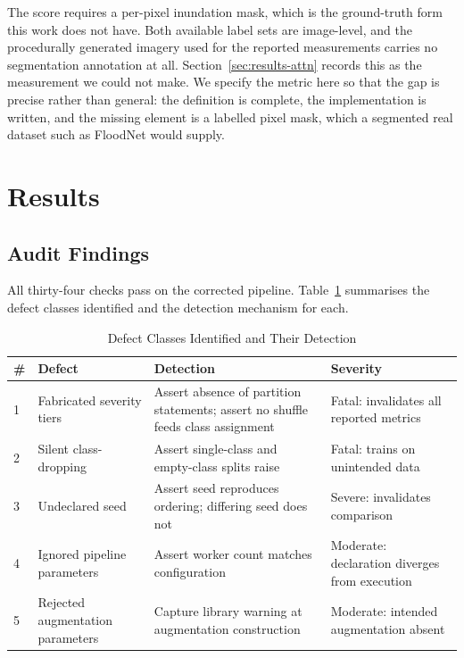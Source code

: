 The score requires a per-pixel inundation mask, which is the ground-truth form
this work does not have. Both available label sets are image-level, and the
procedurally generated imagery used for the reported measurements carries no
segmentation annotation at all. Section~\ref{sec:results-attn} records this as
the measurement we could not make. We specify the metric here so that the gap
is precise rather than general: the definition is complete, the implementation
is written, and the missing element is a labelled pixel mask, which a segmented
real dataset such as FloodNet would supply.

\section{Results}
\label{sec:results}

\subsection{Audit Findings}

All thirty-four checks pass on the corrected pipeline. Table~\ref{tab:defects}
summarises the defect classes identified and the detection mechanism for each.

\begin{table}[!t]
\caption{Defect Classes Identified and Their Detection}
\label{tab:defects}
\centering
\begin{tabular}{@{}p{0.8cm}p{3.0cm}p{7.0cm}p{4.2cm}@{}}
\toprule
\textbf{\#} & \textbf{Defect} & \textbf{Detection} & \textbf{Severity} \\
\midrule
1 & Fabricated severity tiers &
Assert absence of partition statements; assert no shuffle feeds class
assignment &
Fatal: invalidates all reported metrics \\
2 & Silent class-dropping &
Assert single-class and empty-class splits raise &
Fatal: trains on unintended data \\
3 & Undeclared seed &
Assert seed reproduces ordering; differing seed does not &
Severe: invalidates comparison \\
4 & Ignored pipeline parameters &
Assert worker count matches configuration &
Moderate: declaration diverges from execution \\
5 & Rejected augmentation parameters &
Capture library warning at augmentation construction &
Moderate: intended augmentation absent \\
\bottomrule
\end{tabular}
\end{table}

